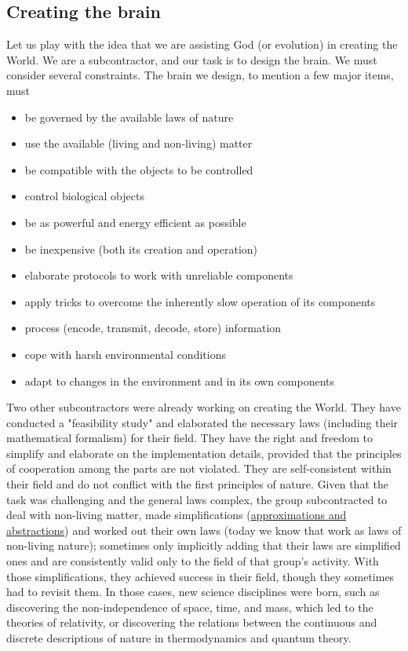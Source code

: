 \subsection{Creating the brain\label{sec:SINGLE_ABSTRACT_CREATING}}
Let us play with the idea that we are assisting God (or evolution) in creating the World.
We are a subcontractor, and our task is to design the brain. We must consider several constraints.  The brain we design, to mention 
a few major items, must
\begin{itemize}
\item be governed by the available laws of nature
\item use the available (living and non-living) matter
\item be compatible with the objects to be controlled
\item control biological objects
\item be as powerful and energy efficient as possible
\item be inexpensive (both its creation and operation)
\item elaborate protocols to work with unreliable components
\item apply tricks to overcome the inherently slow operation of its components
\item process (encode, transmit, decode, store) information
\item cope with harsh environmental conditions 
\item adapt to changes in the environment and in its own components
\end{itemize}


Two other subcontractors were already working on creating the World. They have conducted a "feasibility study" and elaborated the necessary laws (including their mathematical formalism) for their field. They have the right and freedom to simplify and elaborate on the implementation details, provided that the principles of cooperation among the parts are not violated. They are self-consistent within their field and do not conflict with the first principles of nature. Given that the task was challenging and the general laws complex, the group subcontracted to deal with non-living matter,
made simplifications (\hyperlink{Abstractions}{approximations and abstractions}) and worked out their own laws (today we know that work as laws of non-living nature); sometimes only implicitly 
adding that their laws are simplified ones and are consistently valid only
to the field of that group's activity.
With those simplifications, they achieved success in their field, though they sometimes had to revisit them. In those cases, new science disciplines were born,
such as discovering the non-independence of space, time, and mass, which led to the theories of relativity, or discovering the relations between the continuous and discrete descriptions of nature in thermodynamics and quantum theory.

